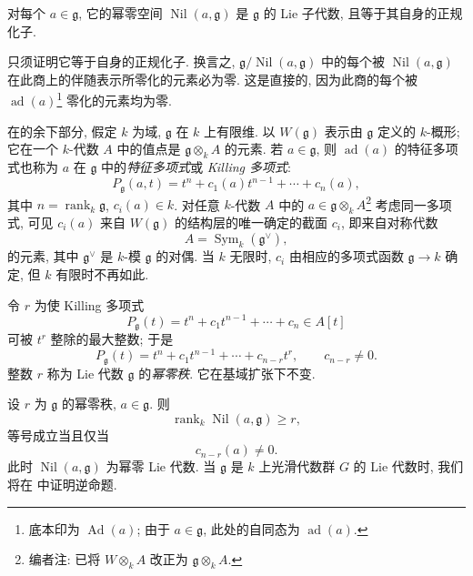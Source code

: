 \begin{proposition}
对每个 \(a\in\mathfrak g\), 它的幂零空间 \(\operatorname{Nil}(a,\mathfrak g)\) 是 \(\mathfrak g\) 的 Lie 子代数, 且等于其自身的正规化子.
\end{proposition}

只须证明它等于自身的正规化子. 换言之, \(\mathfrak g/\operatorname{Nil}(a,\mathfrak g)\) 中的每个被 \(\operatorname{Nil}(a,\mathfrak g)\) 在此商上的伴随表示所零化的元素必为零. 这是直接的, 因为此商的每个被 \(\operatorname{ad}(a)\)\footnote{底本印为 \(\operatorname{Ad}(a)\); 由于 \(a\in\mathfrak g\), 此处的自同态为 \(\operatorname{ad}(a)\).} 零化的元素均为零.

在的余下部分, 假定 \(k\) 为域, \(\mathfrak g\) 在 \(k\) 上有限维. 以 \(W(\mathfrak g)\) 表示由 \(\mathfrak g\) 定义的 \(k\)-概形; 它在一个 \(k\)-代数 \(A\) 中的值点是 \(\mathfrak g\otimes_k A\) 的元素. 若 \(a\in\mathfrak g\), 则 \(\operatorname{ad}(a)\) 的特征多项式也称为 \(a\) 在 \(\mathfrak g\) 中的\emph{特征多项式}或 \emph{Killing 多项式}:
\[
  P_{\mathfrak g}(a,t)
  =
  t^n+c_1(a)t^{n-1}+\cdots+c_n(a),
\]
其中 \(n=\operatorname{rank}_k\mathfrak g\), \(c_i(a)\in k\). 对任意 \(k\)-代数 \(A\) 中的 \(a\in\mathfrak g\otimes_k A\)\footnote{编者注: 已将 \(W\otimes_k A\) 改正为 \(\mathfrak g\otimes_k A\).} 考虑同一多项式, 可见 \(c_i(a)\) 来自 \(W(\mathfrak g)\) 的结构层的唯一确定的截面 \(c_i\), 即来自对称代数
\[
  A=\operatorname{Sym}_k(\mathfrak g^\vee),
\]
的元素, 其中 \(\mathfrak g^\vee\) 是 \(k\)-模 \(\mathfrak g\) 的对偶. 当 \(k\) 无限时, \(c_i\) 由相应的多项式函数 \(\mathfrak g\to k\) 确定, 但 \(k\) 有限时不再如此.

令 \(r\) 为使 Killing 多项式
\[
  P_{\mathfrak g}(t)
  =
  t^n+c_1t^{n-1}+\cdots+c_n
  \in A[t]
\]
可被 \(t^r\) 整除的最大整数; 于是
\[
  P_{\mathfrak g}(t)
  =
  t^n+c_1t^{n-1}+\cdots+c_{n-r}t^r,
  \qquad c_{n-r}\neq0.
\]
整数 \(r\) 称为 Lie 代数 \(\mathfrak g\) 的\emph{幂零秩}. 它在基域扩张下不变.

\begin{proposition}
设 \(r\) 为 \(\mathfrak g\) 的幂零秩, \(a\in\mathfrak g\). 则
\[
  \operatorname{rank}_k\operatorname{Nil}(a,\mathfrak g)\geq r,
\]
等号成立当且仅当
\[
  c_{n-r}(a)\neq0.
\]
此时 \(\operatorname{Nil}(a,\mathfrak g)\) 为幂零 Lie 代数. 当 \(\mathfrak g\) 是 \(k\) 上光滑代数群 \(G\) 的 Lie 代数时, 我们将在  中证明逆命题.
\end{proposition}

